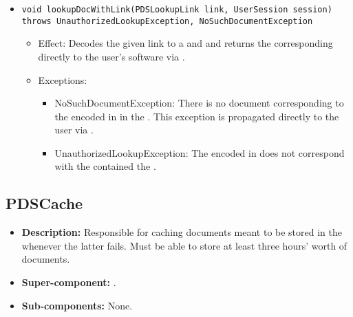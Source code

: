 \begin{itemize}
\begin{itemize}
        \item \texttt{void lookupDocWithLink(PDSLookupLink link, UserSession session) throws UnauthorizedLookupException, NoSuchDocumentException}
		    \begin{itemize}
                \item Effect: Decodes the given link to a  and  and returns the corresponding  directly to the user's software via .
                \item Exceptions: 
				\begin{itemize}
					\item NoSuchDocumentException: There is no document corresponding to the  encoded in  in the . This exception is propagated directly to the user via .
					\item UnauthorizedLookupException: The  encoded in  does not correspond with the  contained the .
				\end{itemize}
            \end{itemize}
    \end{itemize}
\end{itemize}

\subsection{PDSCache}
\begin{itemize}
    \item \textbf{Description:} Responsible for caching documents meant to be stored in the  whenever the latter fails. Must be able to store at least three hours' worth of documents.
    \item \textbf{Super-component:} .
    \item \textbf{Sub-components:} None.
\end{itemize}

